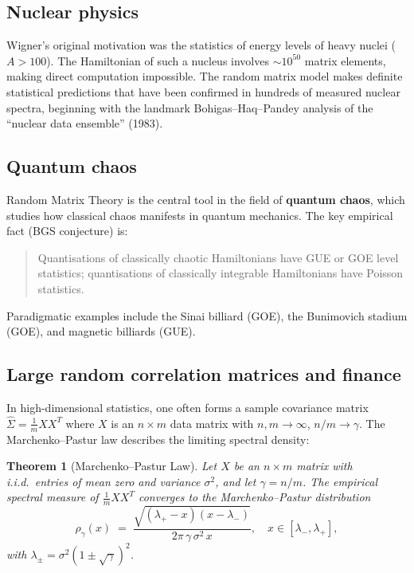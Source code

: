 \documentclass[12pt,a4paper]{amsart}
\newtheorem{theorem}{Theorem}[section]
\theoremstyle{definition}
\theoremstyle{remark}
\begin{document}
\subsection{Nuclear physics}

Wigner's original motivation was the statistics of energy levels of heavy
nuclei ($A > 100$). The Hamiltonian of such a nucleus involves $\sim 10^{50}$
matrix elements, making direct computation impossible. The random matrix
model makes definite statistical predictions that have been confirmed in
hundreds of measured nuclear spectra, beginning with the landmark
Bohigas--Haq--Pandey analysis of the ``nuclear data ensemble'' (1983).

\subsection{Quantum chaos}

Random Matrix Theory is the central tool in the field of
\textbf{quantum chaos}, which studies how classical chaos manifests in
quantum mechanics. The key empirical fact (BGS conjecture) is:
\begin{quote}
  Quantisations of classically chaotic Hamiltonians have GUE or GOE
  level statistics; quantisations of classically integrable Hamiltonians
  have Poisson statistics.
\end{quote}
Paradigmatic examples include the Sinai billiard (GOE), the Bunimovich
stadium (GOE), and magnetic billiards (GUE).

\subsection{Large random correlation matrices and finance}

In high-dimensional statistics, one often forms a sample covariance matrix
$\hat{\Sigma} = \frac{1}{m} X X^T$ where $X$ is an $n \times m$ data matrix
with $n, m \to \infty$, $n/m \to \gamma$. The Marchenko--Pastur law
\cite{MarchenkoPastur1967} describes the limiting spectral density:

\begin{theorem}[Marchenko--Pastur Law]
\label{thm:marchenkapastur}
Let $X$ be an $n \times m$ matrix with i.i.d.\ entries of mean zero and
variance $\sigma^2$, and let $\gamma = n/m$. The empirical spectral measure
of $\frac{1}{m} X X^T$ converges to the Marchenko--Pastur distribution
\[
  \rho_{\gamma}(x)
  \;=\; \frac{\sqrt{(\lambda_+ - x)(x - \lambda_-)}}{2\pi\,\gamma\,\sigma^2\,x},
  \quad x \in [\lambda_-, \lambda_+],
\]
with $\lambda_{\pm} = \sigma^2(1 \pm \sqrt{\gamma})^2$.
\end{theorem}
\end{document}
